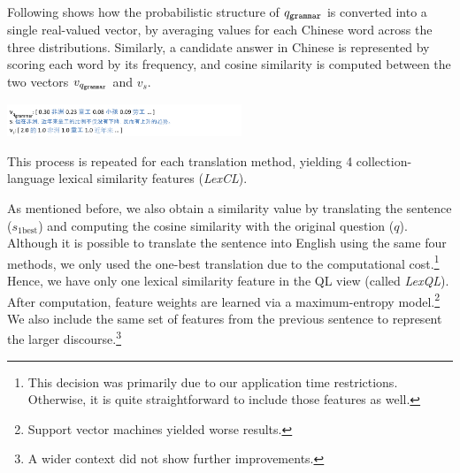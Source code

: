 \documentclass{sig-alternate-05-2015}
\begin{document}
Following shows how the probabilistic structure of $q_{{\tt grammar}}$ is converted into a single real-valued vector,
by averaging values for each Chinese word across the three distributions.
Similarly, a candidate answer in Chinese is represented by scoring each word by its frequency, and cosine similarity
is computed between the two vectors $v_{q_{{\tt grammar}}}$ and $v_s$.

\vspace{-0.1cm}
\includegraphics[width=7cm]{example2.pdf}

This process is repeated for each translation method, yielding 4 collection-language lexical similarity features 
(\emph{LexCL}).

As mentioned before, we also obtain a similarity value by translating the sentence ($s_{\textrm{1best}}$) 
and computing the cosine similarity with the original question ($q$). Although it is possible to translate the 
sentence into English using the same four methods, we only used the one-best translation due to the computational 
cost.\footnote{This decision was primarily due to our application time restrictions. Otherwise, it is
quite straightforward to include those features as well.} Hence, we have only one lexical similarity feature in the QL 
view (called \emph{LexQL}).
After computation, feature weights are learned via a maximum-entropy model.\footnote{Support vector machines 
yielded worse results.} We also include the 
same set of features from the previous sentence to represent the larger discourse.\footnote{A wider context did not
show further improvements.}
\end{document}
